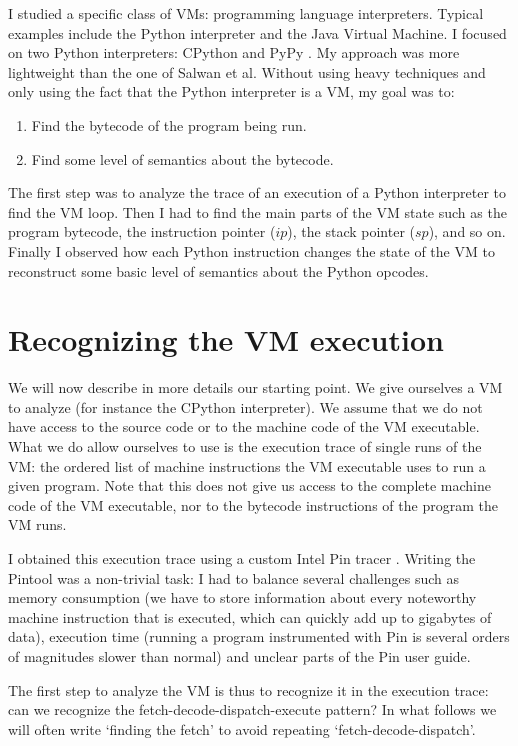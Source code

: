 \documentclass[english]{article}
\begin{document}
I studied a specific class of VMs: programming language interpreters. Typical examples include the Python interpreter and the Java Virtual Machine. I focused on two Python interpreters: CPython \cite{cpython} and PyPy \cite{pypy}. My approach was more lightweight than the one of Salwan et al. Without using heavy techniques and only using the fact that the Python interpreter is a VM, my goal was to:
\begin{enumerate}
	\item Find the bytecode of the program being run.
	\item Find some level of semantics about the bytecode.
\end{enumerate}

The first step was to analyze the trace of an execution of a Python interpreter to find the VM loop. Then I had to find the main parts of the VM state such as the program bytecode, the instruction pointer ($ip$), the stack pointer ($sp$), and so on. Finally I observed how each Python instruction changes the state of the VM to reconstruct some basic level of semantics about the Python opcodes.

\section{Recognizing the VM execution}

We will now describe in more details our starting point. We give ourselves a VM to analyze (for instance the CPython interpreter). We assume that we do not have access to the source code or to the machine code of the VM executable. What we do allow ourselves to use is the execution trace of single runs of the VM: the ordered list of machine instructions the VM executable uses to run a given program. Note that this does not give us access to the complete machine code of the VM executable, nor to the bytecode instructions of the program the VM runs. 

I obtained this execution trace using a custom Intel Pin tracer \cite{intelpin}. Writing the Pintool was a non-trivial task: I had to balance several challenges such as memory consumption (we have to store information about every noteworthy machine instruction that is executed, which can quickly add up to gigabytes of data), execution time (running a program instrumented with Pin is several orders of magnitudes slower than normal) and unclear parts of the Pin user guide.

The first step to analyze the VM is thus to recognize it in the execution trace: can we recognize the fetch-decode-dispatch-execute pattern? In what follows we will often write `finding the fetch' to avoid repeating `fetch-decode-dispatch'.
\end{document}
